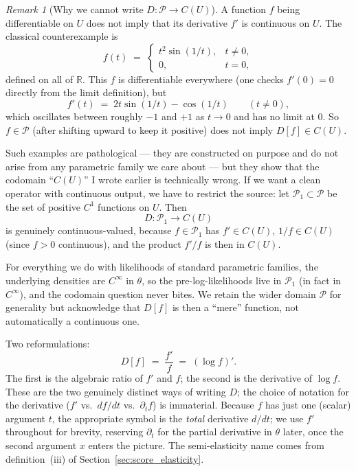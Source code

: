 \documentclass[a4paper,oneside,12pt]{extarticle}
\theoremstyle{plain}
\theoremstyle{definition}
\theoremstyle{remark}
\newtheorem{remark}[proposition]{Remark}
\begin{document}
\begin{remark}[Why we cannot write $D: \mathcal{P} \to C(U)$]
\label{rem:derivative_not_continuous}
A function $f$ being differentiable on $U$ does not imply that its
derivative $f'$ is continuous on $U$.  The classical counterexample
is
\[
  f(t) \;=\;
  \begin{cases}
    t^2 \sin(1/t), & t \neq 0,\\
    0, & t = 0,
  \end{cases}
\]
defined on all of $\mathbb{R}$.  This $f$ is differentiable
everywhere (one checks $f'(0)=0$ directly from the limit definition),
but
\[
  f'(t) \;=\; 2t\sin(1/t) - \cos(1/t)
  \qquad (t\neq 0),
\]
which oscillates between roughly $-1$ and $+1$ as $t\to 0$ and has no
limit at $0$.  So $f \in \mathcal{P}$ (after shifting upward to keep
it positive) does not imply $D[f] \in C(U)$.

Such examples are pathological --- they are constructed on purpose
and do not arise from any parametric family we care about --- but
they show that the codomain ``$C(U)$'' I wrote earlier is technically
wrong.  If we want a clean operator with continuous output, we have
to restrict the source: let $\mathcal{P}_1 \subset \mathcal{P}$ be
the set of positive $C^1$ functions on $U$.  Then
\[
  D: \mathcal{P}_1 \longrightarrow C(U)
\]
is genuinely continuous-valued, because $f \in \mathcal{P}_1$ has
$f'\in C(U)$, $1/f \in C(U)$ (since $f>0$ continuous), and the
product $f'/f$ is then in $C(U)$.

For everything we do with likelihoods of standard parametric
families, the underlying densities are $C^\infty$ in $\theta$, so
the pre-log-likelihoods live in $\mathcal{P}_1$ (in fact in $C^\infty$),
and the codomain question never bites.  We retain the wider domain
$\mathcal{P}$ for generality but acknowledge that $D[f]$ is then a
``mere'' function, not automatically a continuous one.
\end{remark}

Two reformulations:
\[
  D[f] \;=\; \frac{f'}{f} \;=\; (\log f)'.
\]
The first is the algebraic ratio of $f'$ and $f$; the second is the
derivative of $\log f$.  These are the two genuinely distinct ways
of writing $D$; the choice of notation for the derivative ($f'$
vs.\ $df/dt$ vs.\ $\partial_t f$) is immaterial.  Because $f$ has
just one (scalar) argument $t$, the appropriate symbol is the
\emph{total} derivative $d/dt$; we use $f'$ throughout for brevity,
reserving $\partial_t$ for the partial derivative in $\theta$ later,
once the second argument $x$ enters the picture.
The semi-elasticity name comes from definition~(iii) of
Section~\ref{sec:score_elasticity}.
\end{document}
